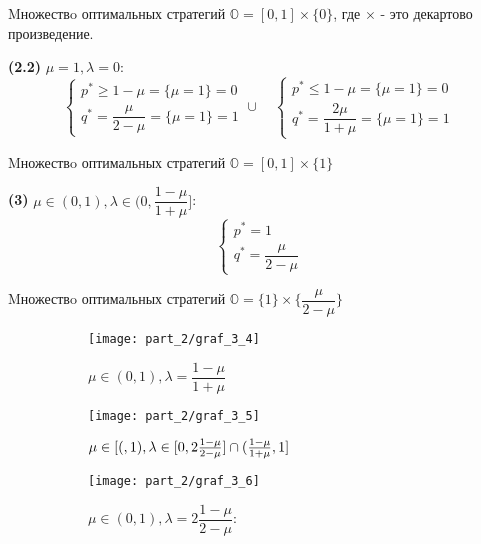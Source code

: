 \begin{flushleft}
Mножествo оптимальных стратегий 
$\mathbb{O} = [0, 1] \times \{0\}$, где $\times$ - 
это декартово произведение.

\hspace{5mm}

\textbf{(2.2)}
$\mu = 1, \lambda = 0:$
$$
	\begin{cases}
		p^* \geqslant 1-\mu = \{\mu=1\}=0 \\
		q^* = \dfrac{\mu}{2-\mu} = \{\mu=1\}=1
	\end{cases} \cup \quad
	\begin{cases}
		p^* \leqslant 1 - \mu = \{\mu = 1\} = 0\ \\
		q^* = \dfrac{2\mu}{1 + \mu} = \{\mu = 1\} = 1 
	\end{cases}
$$

Mножествo оптимальных стратегий 
$\mathbb{O} = [0, 1] \times \{1\}$

\hspace{5mm}

\textbf{(3)}
$\mu \in (0,1), \lambda \in (0, \dfrac{1 - \mu}{1 + \mu}]$: 
$$
	\begin{cases}
		p^* = 1 \\ 
		q^* = \dfrac{\mu}{2 - \mu} 
	\end{cases}
$$

Mножествo оптимальных стратегий 
$\mathbb{O} = \{1\} \times \{\dfrac{\mu}{2-\mu}\}$ 

\begin{figure}[H]
	\centering
	\begin{subfigure}[b]{0.3 \textwidth}
		\texttt{[image: part\_2/graf\_3\_4]}
		\caption{
			$\mu \in (0,1), \lambda = \dfrac{1-\mu}{1+\mu}$		
		}
	\end{subfigure}
	\begin{subfigure}[b]{0.3 \textwidth}
		\texttt{[image: part\_2/graf\_3\_5]}
		\caption{
			$\mu \in [(, 1), \newline 
			\lambda \in 
			[0, 2\frac{1 - \mu}{2 - \mu}] \cap 
			(\frac{1 - \mu}{1 + \mu}, 1]$
		}
	\end{subfigure}
	\begin{subfigure}[b]{0.3 \textwidth}	
		\texttt{[image: part\_2/graf\_3\_6]}
		\caption{
			$\mu \in (0, 1), \lambda = 2\dfrac{1 - \mu}{2 - \mu}$: 
		}
	\end{subfigure}
	\caption{}
\end{figure}

\hspace{5mm}


\end{flushleft}
